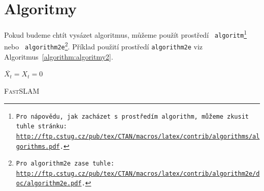 \documentclass[11pt, a4paper]{article}
\begin{document}
\pagebreak

\section{Algoritmy}
\label{section:algoritmy}
Pokud budeme chtít vysázet algoritmus, můžeme použít prostředí \texttt{ algoritm\footnote{Pro nápovědu, jak zacházet s~prostředím\texttt{ algorithm,} můžeme zkusit tuhle stránku: \\
\href{http://ftp.cstug.cz/pub/tex/CTAN/macros/latex/contrib/algorithms/algorithms.pdf}{http://ftp.cstug.cz/pub/tex/CTAN/macros/latex/contrib/algorithms/algorithms.pdf}. }}
nebo \texttt{ algorithm2e\footnote{ Pro \texttt{algorithm2e} zase tuhle: \href{http://ftp.cstug.cz/pub/tex/CTAN/macros/latex/contrib/algorithm2e/doc/algorithm2e.pdf}{http://ftp.cstug.cz/pub/tex/CTAN/macros/latex/contrib/algorithm2e/doc/algorithm2e.pdf}.}}.
Příklad použití prostředí \texttt{algorithm2e} viz Algoritmus~\ref{algorithm:algoritmy2}.\\

\IncMargin{2em}
	\begin{algorithm}[H]
        
		\SetNlSty{}{}{:}
		\SetNlSkip{0.5em}
		\SetInd{0.6em}{0.6em}

		\Indm\Indmm
		\Indp\Indpp
		\BlankLine
        $ \overline{X_t} = X_t = 0 $ \\
 
        
\caption{\textsc{FastSLAM}}
\label{algorithm:algoritmy2}
\end{algorithm}
\end{document}
